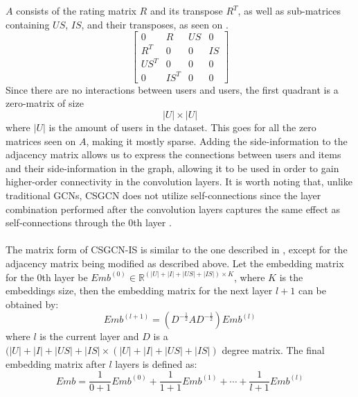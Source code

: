 $A$ consists of the rating matrix $R$ and its transpose $R^T$, as well as sub-matrices containing $US$, $IS$, and their transposes, as seen on .
\begin{equation}\label{csgcn_is_adj_mat}
    \begin{bmatrix}
    0 & R & US & 0\\
    R^T & 0 & 0 & IS\\
    US^T & 0 & 0 & 0 \\
    0 & IS^T & 0 & 0
    \end{bmatrix}
\end{equation}
Since there are no interactions between users and users, the first quadrant is a zero-matrix of size $$|U|\times|U|$$ where $|U|$ is the amount of users in the dataset.
This goes for all the zero matrices seen on $A$, making it mostly sparse.
Adding the side-information to the adjacency matrix allows us to express the connections between users and items and their side-information in the graph, allowing it to be used in order to gain higher-order connectivity in the convolution layers.
It is worth noting that, unlike traditional GCNs, CSGCN does not utilize self-connections since the layer combination performed after the convolution layers captures the same effect as self-connections through the 0th layer \cite{LightGCN}.
\\\\
The matrix form of CSGCN-IS is similar to the one described in \cite{LightGCN}, except for the adjacency matrix being modified as described above.
Let the embedding matrix for the 0th layer be $Emb^{(0)} \in \mathbb{R}^{(|U| + |I| + |US| + |IS|) \times K}$, where $K$ is the embeddings size, then the embedding matrix for the next layer $l+1$ can be obtained by:
\begin{equation}
    Emb^{(l+1)} = (D^{-\frac{1}{2}}AD^{-\frac{1}{2}})Emb^{(l)}
\end{equation}
where $l$ is the current layer and $D$ is a $(|U| + |I| + |US| + |IS| \times (|U| + |I| + |US| + |IS|)$ degree matrix. 
The final embedding matrix after $l$ layers is defined as:
\begin{equation}
    Emb = \frac{1}{0 +1}Emb^{(0)} + \frac{1}{1 +1}Emb^{(1)} + \cdots + \frac{1}{l +1}Emb^{(l)}
\end{equation}

